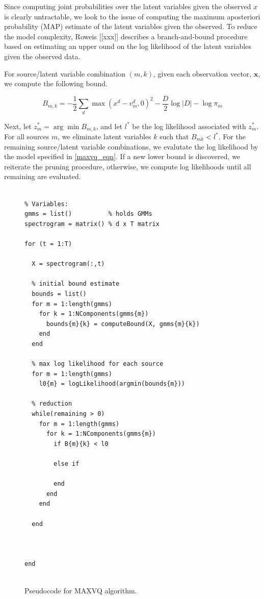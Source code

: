 \documentclass[11pt, oneside, a4paper]{report}
\begin{document}
Since computing joint probabilities over the latent variables given the
observed $x$ is clearly  untractable, we look to the issue of
computing the maximum aposteriori probability (MAP) estimate of the
latent variables given the observed. To reduce the model complexity,
Roweis [[xxx]] describes a branch-and-bound procedure based on
estimating an upper ound on the log likelihood of the latent variables
given the observed data.

For source/latent variable combination $(m,k)$, given each observation
vector, $\mathbf{x}$, we compute the following bound.

\begin{equation}\label{bound}
  B_{m,k} = -\frac{1}{2}\sum_d \max(x^d - v_m^d,0)^2 - \frac{D}{2}\log|D|-\log \pi_m
\end{equation}

Next, let $z_m^{*} = \arg \min B_{m,k}$, and let $l^{*}$ be
the log likelihood associated with $z_m^{*}$. For all sources $m$, we
eliminate latent variables $k$ such that $B_{mk}<l^{*}$. For the
remaining source/latent variable combinations, we evalutate the log
likelihood by the model specified in \ref{maxvq_eqn}. If a new lower
bound is discovered, we reiterate the pruning procedure, otherwise, we
compute log likelihoods until all remaining are evaluated.



\begin{figure}[!htpb]
  \begin{lstlisting}[frame=single]
    
% Variables:
gmms = list()          % holds GMMs 
spectrogram = matrix() % d x T matrix

for (t = 1:T)
  
  X = spectrogram(:,t)

  % initial bound estimate
  bounds = list()
  for m = 1:length(gmms)
    for k = 1:NComponents(gmms{m})
      bounds{m}{k} = computeBound(X, gmms{m}{k})
    end
  end

  % max log likelihood for each source
  for m = 1:length(gmms)
    l0{m} = logLikelihood(argmin(bounds{m}))
  
  % reduction
  while(remaining > 0)
    for m = 1:length(gmms)
      for k = 1:NComponents(gmms{m})
        if B{m}{k} < l0
          
        else if 
          
        end
      end
    end
  
  end
 


end
    
  \end{lstlisting}
  \caption{Pseudocode for MAXVQ algorithm.}
  \label{maxvq_pseudo}
\end{figure}
\end{document}
